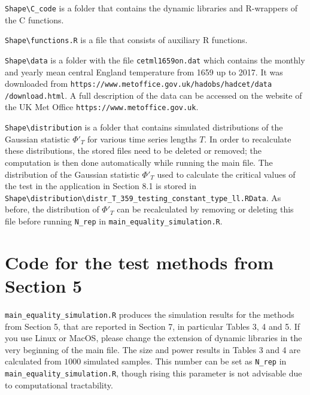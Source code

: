 \documentclass[a4paper,12pt]{article}
\begin{document}
\verb|Shape\C_code| \hspace{1pt} is a folder that contains the dynamic libraries and R-wrappers of the C functions.

\verb|Shape\functions.R| \hspace{1pt} is a file that consists of auxiliary R functions.

\verb|Shape\data| \hspace{1pt} is a folder with the file \verb|cetml1659on.dat| which contains the monthly and yearly mean central England temperature from 1659 up to 2017. It was downloaded from \verb|https://www.metoffice.gov.uk/hadobs/hadcet/data| \verb|/download.html|. A full description of the data can be accessed on the website of the UK Met Office \verb|https://www.metoffice.gov.uk|. 

\verb|Shape\distribution| \hspace{1pt} is a folder that  contains simulated distributions of the Gaussian statistic $\Phi'_{T}$ for various time series lengths $T$. In order to recalculate these distributions, the stored files need to be deleted or removed; the computation is then done automatically while running the main file. The distribution of the Gaussian statistic $\Phi'_T$ used to calculate the critical values of the test in the application in Section 8.1 is stored in \verb|Shape\distribution\distr_T_359_testing_constant_type_ll.RData|. \newline As before, the distribution of $\Phi'_T$ can be recalculated by removing or deleting this file before running \verb|N_rep| in \verb|main_equality_simulation.R|.  
\vspace{0.2cm}



\section*{Code for the test methods from Section 5}


\everypar{\hangafter=1\hangindent=1.45cm\relax}

\verb|main_equality_simulation.R| \hspace{1pt} produces the simulation results for the methods from Section 5, that are reported in Section 7, in particular Tables 3, 4 and 5. If you use Linux or MacOS, please change the extension of dynamic libraries in the very beginning of the main file. The size and power results in Tables 3 and 4 are calculated from $1000$ simulated samples. This number can be set as \verb|N_rep| in \verb|main_equality_simulation.R|, though rising this parameter is not advisable due to computational tractability. 
\end{document}
